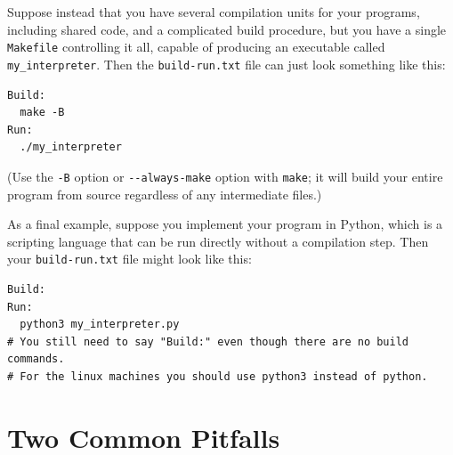 \documentclass[11pt]{article}
\renewcommand{\t}[1]{\texttt{#1}}
\theoremstyle{definition}
\begin{document}
Suppose instead that you have several compilation units for your programs, including shared code, and a complicated build procedure, but you have a single \t{Makefile} controlling it all, capable of producing an executable called \t{my\_interpreter}.  Then the \t{build-run.txt} file can just look something like this:
\begin{verbatim}
Build:
  make -B
Run:
  ./my_interpreter
\end{verbatim}
(Use the \verb|-B| option or \verb|--always-make| option with \t{make}; it will build your entire program from source regardless of any intermediate files.)

As a final example, suppose you implement your program in Python, which is a scripting language that can be run directly without a compilation step.  Then your \t{build-run.txt} file might look like this:
\begin{verbatim}
Build:
Run:
  python3 my_interpreter.py
# You still need to say "Build:" even though there are no build commands.
# For the linux machines you should use python3 instead of python.
\end{verbatim}

\section{Two Common Pitfalls}
\end{document}
